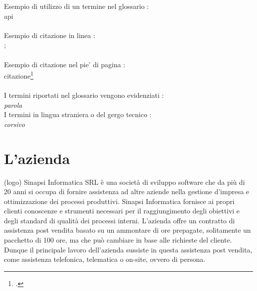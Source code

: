 \noindent Esempio di utilizzo di un termine nel glossario :\\\gls{api}\\ \\
\noindent Esempio di citazione in linea :\\\cite{site:agile-manifesto};\\\\
\noindent Esempio di citazione nel pie' di pagina :\\citazione\footcite{womak:lean-thinking} \\\\
\noindent I termini riportati nel glossario vengono evidenziati :\\\emph{parola}\glsfirstoccur\\ \noindent I termini in lingua straniera o del gergo tecnico :\\ \emph{corsivo}\\




\section{L'azienda}
(logo)
Sinapsi Informatica SRL è una società di sviluppo software che da più di 20 anni si occupa di fornire assistenza ad altre aziende nella gestione d'impresa e ottimizzazione dei processi produttivi.
Sinapsi Informatica fornisce ai propri clienti conoscenze e strumenti necessari per il raggiungimento degli obiettivi e degli standard di qualità dei processi interni.
L'azienda offre un contratto di assistenza post vendita basato su un ammontare di ore prepagate, solitamente un pacchetto di 100 ore, ma che può cambiare in base alle richieste del cliente.
Dunque il principale lavoro dell'azienda sussiste in questa assistenza post vendita, come assistenza telefonica, telematica o on-site, ovvero di persona.
